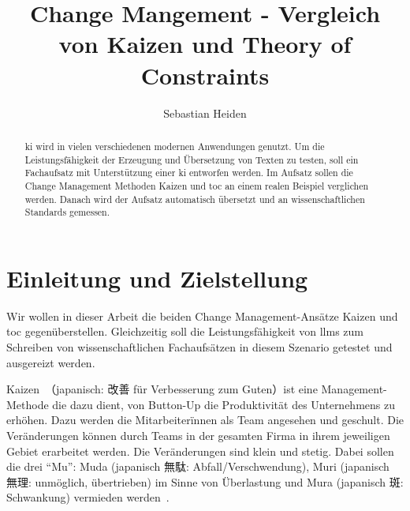 \documentclass[acmengage,authorversion,nonacm]{acmart}
\begin{document}
	


	\title{Change Mangement - Vergleich von Kaizen und Theory of Constraints}
	
	\author{Sebastian Heiden}

\begin{abstract}
\gls{ki} wird in vielen verschiedenen modernen Anwendungen genutzt. Um die Leistungsfähigkeit der Erzeugung und Übersetzung von Texten zu testen, soll ein Fachaufsatz mit Unterstützung einer \gls{ki} entworfen werden. Im Aufsatz sollen die Change Management Methoden Kaizen und \gls{toc} an einem realen Beispiel verglichen werden. Danach wird der Aufsatz automatisch übersetzt und an wissenschaftlichen Standards gemessen.
\end{abstract}


\received{\today}


\maketitle

\section{Einleitung und Zielstellung}

Wir wollen in dieser Arbeit die beiden Change Management-Ansätze Kaizen und \gls{toc} gegenüberstellen.
Gleichzeitig soll die Leistungsfähigkeit von \glspl{llm} zum Schreiben von wissenschaftlichen Fachaufsätzen in diesem Szenario getestet und ausgereizt werden.

Kaizen~（japanisch: 改善 für Verbesserung zum Guten）ist eine Management-Methode die dazu dient, von Button-Up die Produktivität des Unternehmens zu erhöhen.
Dazu werden die Mitarbeiterïnnen als Team angesehen und geschult. Die Veränderungen können durch Teams in der gesamten Firma in ihrem jeweiligen Gebiet erarbeitet werden.
Die Veränderungen sind klein und stetig. Dabei sollen die drei "`Mu"': Muda (japanisch 無駄: Abfall/Verschwendung), Muri (japanisch 無理: unmöglich, übertrieben) im Sinne von Überlastung und Mura (japanisch 斑: Schwankung) vermieden werden~\cite{helmold_kaizen_2021}.
\end{document}
